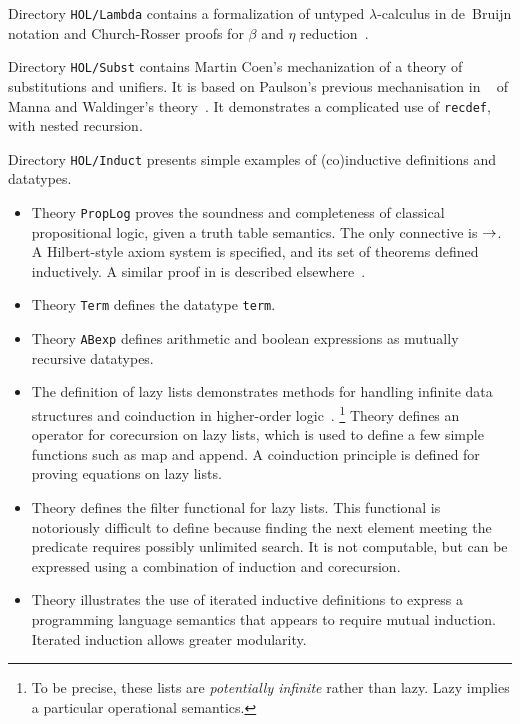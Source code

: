 Directory \texttt{HOL/Lambda} contains a formalization of untyped
$\lambda$-calculus in de~Bruijn notation and Church-Rosser proofs for $\beta$
and $\eta$ reduction~\cite{Nipkow-CR}.

Directory \texttt{HOL/Subst} contains Martin Coen's mechanization of a theory of
substitutions and unifiers.  It is based on Paulson's previous
mechanisation in {\LCF}~\cite{paulson85} of Manna and Waldinger's
theory~\cite{mw81}.  It demonstrates a complicated use of \texttt{recdef},
with nested recursion.

Directory \texttt{HOL/Induct} presents simple examples of (co)inductive
definitions and datatypes.
\begin{itemize}
\item Theory \texttt{PropLog} proves the soundness and completeness of
  classical propositional logic, given a truth table semantics.  The only
  connective is $\rightarrow$.  A Hilbert-style axiom system is specified, and its
  set of theorems defined inductively.  A similar proof in \ZF{} is
  described elsewhere~\cite{paulson-set-II}.

\item Theory \texttt{Term} defines the datatype {\tt term}.

\item Theory \texttt{ABexp} defines arithmetic and boolean expressions
 as mutually recursive datatypes.

\item The definition of lazy lists demonstrates methods for handling
  infinite data structures and coinduction in higher-order
  logic~\cite{paulson-coind}.%
\footnote{To be precise, these lists are \emph{potentially infinite} rather
  than lazy.  Lazy implies a particular operational semantics.}
  Theory  defines an operator for
  corecursion on lazy lists, which is used to define a few simple functions
  such as map and append.   A coinduction principle is defined
  for proving equations on lazy lists.
  
\item Theory  defines the filter functional for lazy lists.
  This functional is notoriously difficult to define because finding the next
  element meeting the predicate requires possibly unlimited search.  It is not
  computable, but can be expressed using a combination of induction and
  corecursion.  

\item Theory  illustrates the use of iterated inductive definitions
  to express a programming language semantics that appears to require mutual
  induction.  Iterated induction allows greater modularity.
\end{itemize}

